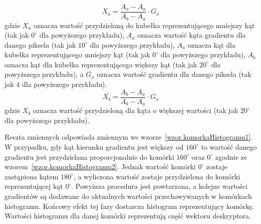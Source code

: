 \documentclass[a4paper,twoside,12pt]{book}
\begin{document}
    \large
    \begin{equation}
        X_{a} = \frac{A_{x}-A_{a}}{A_{b}-A_{a}} \cdot G_{x}
        \label{wzor.komorkaHistogramu1}
    \end{equation}
    \normalsize
    gdzie $X_{a}$ oznacza wartość przydzielaną do kubełka reprezentującego mniejszy kąt (tak jak $0^{\circ}$
    dla powyższego przykładu), $A_{x}$ oznacza wartość kąta gradientu dla danego piksela (tak jak $10^{\circ}$
    dla powyższego przykładu), $A_{a}$ oznacza kąt dla kubełka reprezentującego mniejszy kąt (tak jak $0^{\circ}$
    dla powyższego przykładu), $A_{b}$ oznacza kąt dla kubełka reprezentującego większy kąt (tak jak $20^{\circ}$
    dla powyższego przykładu), a $G_{x}$ oznacza wartość gradientu dla danego piksela (tak jak 4 dla powyższego
    przykładu).
    \large
    \begin{equation}
        X_{b} = \frac{A_{b}-A_{x}}{A_{b}-A_{a}} \cdot G_{x}
        \label{wzor.komorkaHistogramu2}
    \end{equation}
    \normalsize
    gdzie $X_{b}$ oznacza wartość przydzieloną dla kąta o większej wartości (tak jak $20^{\circ}$
    dla powyższego przykładu).

    Reszta zmiennych odpowiada zmiennym we wzorze~\ref{wzor.komorkaHistogramu1}.
    W przypadku, gdy kąt kierunku gradientu jest większy od $160^{\circ}$ to wartość danego gradientu jest
    przydzielana proporcjonalnie do komórki $160^{\circ}$ oraz $0^{\circ}$ zgodnie ze
    wzorem~\ref{wzor.komorkaHistogramu2}. Jednak wartość komórki $0^{\circ}$ zostaje zastąpiona kątem $180^{\circ}$,
    a wyliczona wartość zostaje przydzielona do komórki reprezentującej kąt $0^{\circ}$.
    Powyższa procedura jest powtarzana, a kolejne wartości gradientów są dodawane do aktualnych wartości przechowywanych
    w komórkach histogramu. Końcowy efekt tej fazy dostarcza histogram reprezentujący komórkę. Wartości histogramu
    dla danej komórki reprezentują część wektoru deskryptora.
\end{document}
